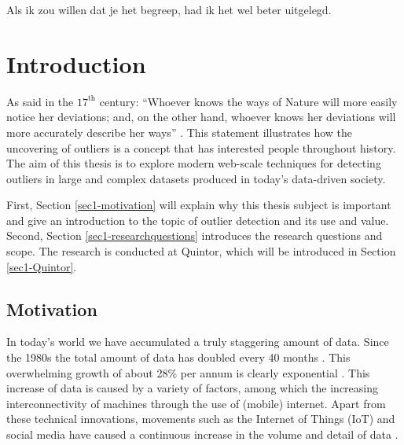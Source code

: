 \begin{savequote}[78mm] 
Als ik zou willen dat je het begreep, had ik het wel beter uitgelegd.  
\end{savequote}

\chapter{Introduction \label{chap1:introduction}}

As said in the $17^{\text{th}}$ century: ``Whoever knows the ways of Nature will more easily notice her deviations; and, on the other hand, whoever knows her deviations will more accurately describe her ways'' \cite{bacon2010novum}. This statement illustrates how the uncovering of outliers is a concept that has interested people throughout history. The aim of this thesis is to explore modern web-scale techniques for detecting outliers in large and complex datasets produced in today's data-driven society.

First, Section \ref{sec1-motivation} will explain why this thesis subject is important and give an introduction to the topic of outlier detection and its use and value. Second, Section \ref{sec1-researchquestions} introduces the research questions and scope. The research is conducted at Quintor, which will be introduced in Section \ref{sec1-Quintor}. 

\section{Motivation \label{sec1-motivation}}
In today's world we have accumulated a truly staggering amount of data. Since the 1980s the total amount of data has doubled every 40 months \cite{Hilbert01042011}. This overwhelming growth of about 28\% per annum is clearly exponential \cite{6479953}. This increase of data is caused by a variety of factors, among which the increasing interconnectivity of machines through the use of (mobile) internet. Apart from these technical innovations, movements such as the Internet of Things (IoT) and social media have caused a continuous increase in the volume and detail of data \cite{holler2014from}. 

